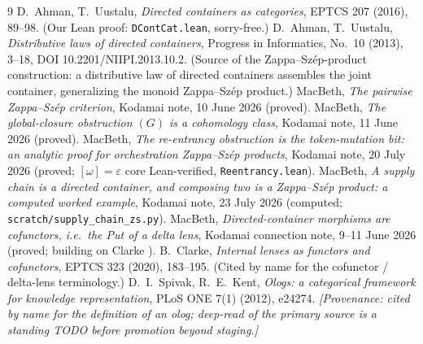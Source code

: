 \documentclass[11pt]{article}
\theoremstyle{definition}
\begin{document}
\begin{thebibliography}{9}
 D.~Ahman, T.~Uustalu, \emph{Directed containers as categories}, EPTCS 207
(2016), 89--98. (Our Lean proof: \texttt{DContCat.lean}, sorry-free.)
 D.~Ahman, T.~Uustalu, \emph{Distributive laws of directed containers},
Progress in Informatics, No.~10 (2013), 3--18, DOI 10.2201/NIIPI.2013.10.2. (Source of the Zappa--Sz\'ep-product
construction: a distributive law of directed containers assembles the joint container,
generalizing the monoid Zappa--Sz\'ep product.)
 MacBeth, \emph{The pairwise Zappa--Sz\'ep criterion}, Kodamai note,
10 June 2026 (proved).
 MacBeth, \emph{The global-closure obstruction $(G)$ is a cohomology class},
Kodamai note, 11 June 2026 (proved).
 MacBeth, \emph{The re-entrancy obstruction is the token-mutation bit: an
analytic proof for orchestration Zappa--Sz\'ep products}, Kodamai note, 20 July 2026
(proved; $[\omega]=\varepsilon$ core Lean-verified, \texttt{Reentrancy.lean}).
 MacBeth, \emph{A supply chain is a directed container, and composing two
is a Zappa--Sz\'ep product: a computed worked example}, Kodamai note, 23 July 2026 (computed;
\texttt{scratch/supply\_chain\_zs.py}).
 MacBeth, \emph{Directed-container morphisms are cofunctors, i.e.\ the Put
of a delta lens}, Kodamai connection note, 9--11 June 2026 (proved; building on
Clarke \cite{clarke-lenses}).
 B.~Clarke, \emph{Internal lenses as functors and cofunctors}, EPTCS
323 (2020), 183--195. (Cited by name for the cofunctor / delta-lens terminology.)
 D.~I.~Spivak, R.~E.~Kent, \emph{Ologs: a categorical framework for
knowledge representation}, PLoS ONE 7(1) (2012), e24274. \emph{[Provenance: cited by name for
the definition of an olog; deep-read of the primary source is a standing TODO before
promotion beyond staging.]}
\end{thebibliography}
\end{document}

